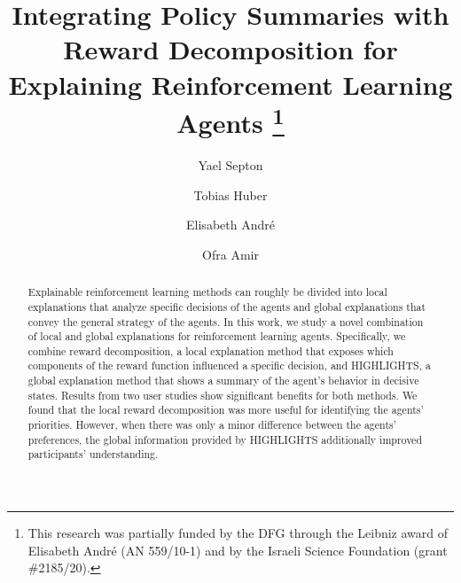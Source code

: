 \documentclass[runningheads]{llncs}
\begin{document}
%
\title{Integrating Policy Summaries with Reward Decomposition for Explaining Reinforcement Learning Agents
\thanks{This research was partially funded by the DFG through the Leibniz award of Elisabeth André (AN 559/10-1) and by the Israeli Science Foundation (grant \#2185/20).}
}
%
%

\author{Yael Septon \and
Tobias Huber \and
Elisabeth André  \and
Ofra Amir
}



\maketitle              %
%
\begin{abstract}
Explainable reinforcement learning methods can roughly be divided into local explanations that analyze specific decisions of the agents and global explanations that convey the general strategy of the agents. In this work, we study a novel combination of local and global explanations for reinforcement learning agents. Specifically, we combine reward decomposition, a local explanation method that exposes which components of the reward function influenced a specific decision, and HIGHLIGHTS, a global explanation method that shows a summary of the agent's behavior in decisive states. Results from two user studies show significant benefits for both methods. We found that the local reward decomposition was more useful for identifying the agents' priorities. However, when there was only a minor difference between the agents' preferences, the global information provided by HIGHLIGHTS additionally improved participants' understanding.

\end{abstract}
%
%
%
\end{document}
